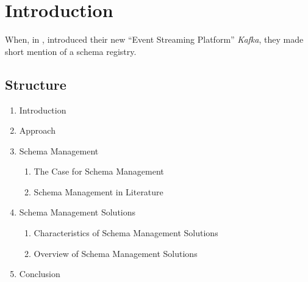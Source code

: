 
\section{Introduction}\label{sec:introduction}

When, in \citeyear{kreps_kafka_2011}, \citeauthor{kreps_kafka_2011} introduced their new \enquote{Event Streaming Platform} \emph{Kafka}, they made short mention of a schema registry.

\subsection{Structure}

\begin{enumerate}
  \item Introduction
  \item Approach
  \item Schema Management
        \begin{enumerate}
          \item The Case for Schema Management
          \item Schema Management in Literature
        \end{enumerate}
  \item Schema Management Solutions
        \begin{enumerate}
          \item Characteristics of Schema Management Solutions
          \item Overview of Schema Management Solutions
        \end{enumerate}
  \item Conclusion
\end{enumerate}